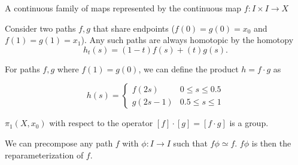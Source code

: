 \documentclass[10pt]{article}
\begin{document}
\begin{definition}
A continuous family of maps represented by the continuous map $f: I \times I \to X$ 
\end{definition}

\begin{example}
Consider two paths $f, g$ that share endpoints ($f(0) = g(0) = x_0$ and $f(1) =
g(1) = x_1$). Any such paths are always homotopic by the homotopy 
\[
h_t(s) = (1-t)f(s) + (t)g(s).
\]


\end{example}


\begin{proposition}
\end{proposition}

\begin{definition}

	For paths $f, g$ where $f(1) = g(0)$, we can define the product $h = f \cdot g$ as

\[ h(s) = \begin{cases} 
      f(2s) & 0 \leq s \leq 0.5 \\
      g(2s-1) & 0.5 \leq s \leq 1
   \end{cases}
\]

\end{definition}


\begin{proposition}
	$\pi_1(X, x_0)$ with respect to the operator $[f]\cdot[g] = [f\cdot g]$ is a group.
\end{proposition}

\begin{definition}
	We can precompose any path $f$ with $\phi: I \to I$ such that $f\phi \simeq f$. $f\phi$ is then the reparameterization of $f$.
\end{definition}
\end{document}
